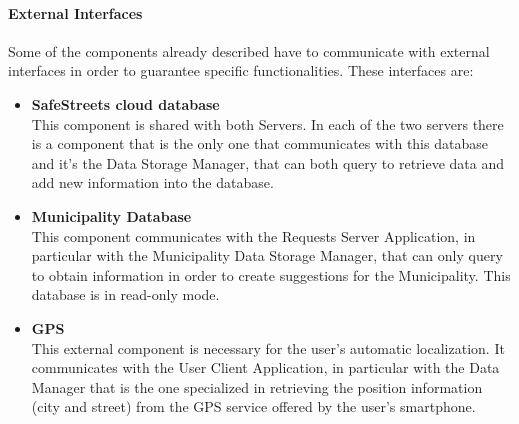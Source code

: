 \documentclass[titlepage]{article}
\begin{document}
\paragraph{\textbf{External Interfaces}}
Some of the components already described have to communicate with external interfaces in order to guarantee specific functionalities. These interfaces are:
\begin{itemize}
\item \textbf{SafeStreets cloud database}\\
This component is shared with both Servers. In each of the two servers there is a component that is the only one that communicates with this database and it's the Data Storage Manager, that can both query to retrieve data and add new information into the database.
\item \textbf{Municipality Database}\\
This component communicates with the Requests Server Application, in particular with the Municipality Data Storage Manager, that can only query to obtain information in order to create suggestions for the Municipality. This database is in read-only mode.
\item \textbf{GPS}\\
This external component is necessary for the user's automatic localization. It communicates with the User Client Application, in particular with the Data Manager that is the one specialized in retrieving the position information (city and street) from the GPS service offered by the user's smartphone.
\end{itemize}
\end{document}
